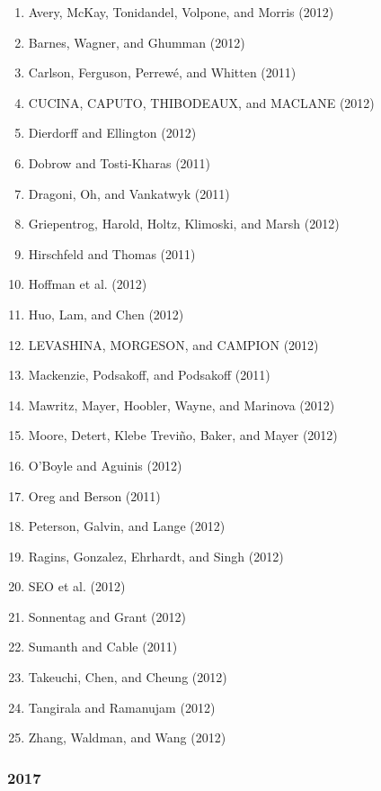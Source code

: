 \documentclass[english,man]{apa6}
\providecommand{\tightlist}{%
  \setlength{\itemsep}{0pt}\setlength{\parskip}{0pt}}
\begin{document}
\begin{enumerate}
\def\labelenumi{\arabic{enumi})}
\tightlist
\item
  Avery, McKay, Tonidandel, Volpone, and Morris (2012)
\item
  Barnes, Wagner, and Ghumman (2012)
\item
  Carlson, Ferguson, Perrewé, and Whitten (2011)
\item
  CUCINA, CAPUTO, THIBODEAUX, and MACLANE (2012)
\item
  Dierdorff and Ellington (2012)
\item
  Dobrow and Tosti-Kharas (2011)
\item
  Dragoni, Oh, and Vankatwyk (2011)
\item
  Griepentrog, Harold, Holtz, Klimoski, and Marsh (2012)
\item
  Hirschfeld and Thomas (2011)
\item
  Hoffman et al. (2012)
\item
  Huo, Lam, and Chen (2012)
\item
  LEVASHINA, MORGESON, and CAMPION (2012)
\item
  Mackenzie, Podsakoff, and Podsakoff (2011)
\item
  Mawritz, Mayer, Hoobler, Wayne, and Marinova (2012)
\item
  Moore, Detert, Klebe Treviño, Baker, and Mayer (2012)
\item
  O'Boyle and Aguinis (2012)
\item
  Oreg and Berson (2011)
\item
  Peterson, Galvin, and Lange (2012)
\item
  Ragins, Gonzalez, Ehrhardt, and Singh (2012)
\item
  SEO et al. (2012)
\item
  Sonnentag and Grant (2012)
\item
  Sumanth and Cable (2011)
\item
  Takeuchi, Chen, and Cheung (2012)
\item
  Tangirala and Ramanujam (2012)
\item
  Zhang, Waldman, and Wang (2012)
\end{enumerate}

\subsubsection{2017}\label{section-31}
\end{document}
